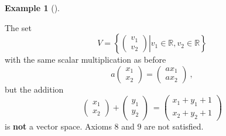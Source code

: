 \documentclass[
  a4paper,
  DIV=11,
  numbers=noendperiod,
  oneside]{scrreprt}
\theoremstyle{definition}
\newtheorem{example}{Example}[chapter]
\theoremstyle{remark}
\begin{document}
\begin{example}[]\protect\hypertarget{exm-vktspace3}{}\label{exm-vktspace3}

The set
\[V= \left\{ \left.  \begin{pmatrix}   v_{1}\\ v_{2}  \end{pmatrix}  \right| v_1 \in   \mathbb{R}, v_2 \in  \mathbb{R}\right\}\]
with the same scalar multiplication as before
\[a   \begin{pmatrix}   x_1 \\ x_2  \end{pmatrix}  =   \begin{pmatrix}   a x_1 \\  a x_2  \end{pmatrix}  \ ,\]
but the addition \[ \begin{pmatrix}   x_1 \\ x_2  \end{pmatrix} 
  +
  \begin{pmatrix}   y_1 \\ y_2  \end{pmatrix} \
  =\begin{pmatrix}   x_1+y_1+1 \\ x_2+y_2+1  \end{pmatrix}\] is
\textbf{not} a vector space. Axioms 8 and 9 are not satisfied.

\end{example}
\end{document}
